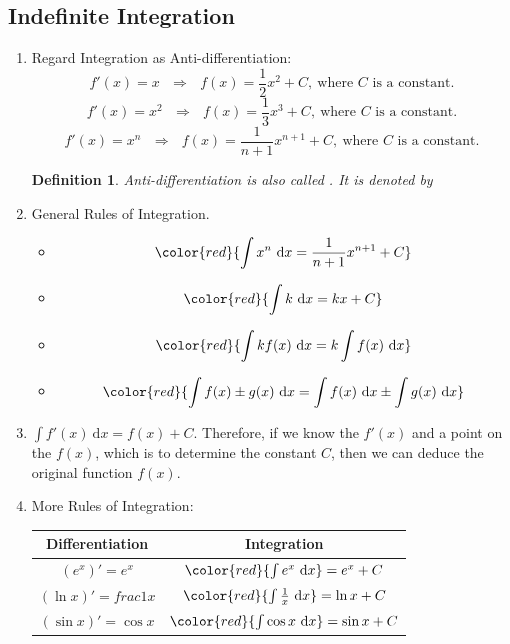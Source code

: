 \documentclass[12pt, a4paper]{article}
\newtheorem{definition}{Definition}[subsection]
\begin{document}
\subsection{Indefinite Integration}
\begin{enumerate}
    \item Regard Integration as Anti-differentiation: 
    $$f'(x)=x\ \ \ \Rightarrow\ \ \ f(x)=\frac{1}{2}x^2+C,\ \text{where }C\text{ is a constant.}$$
    $$f'(x)=x^2\ \ \ \Rightarrow\ \ \ f(x)=\frac{1}{3}x^3+C,\ \text{where }C\text{ is a constant.}$$
    $$f'(x)=x^n\ \ \ \Rightarrow\ \ \ f(x)=\frac{1}{n+1}x^{n+1}+C,\ \text{where }C\text{ is a constant.}$$
    \begin{definition}
        Anti-differentiation is also called \textbf{\color{red}{indefinite integration}}. It is denoted by {}
        \begin{center}{}\end{center}
    \end{definition}
    \item General Rules of Integration. 
    \begin{itemize}
        \item $${\color{red}{\int x^n\ \mathrm{d}x=\frac{1}{n+1}x^{n+1}+C}}$$
        \item $${\color{red}{\int k\ \mathrm{d}x=kx+C}}$$
        \item $${\color{red}{\int kf(x)\ \mathrm{d}x=k\int f(x)\ \mathrm{d}x}}$$
        \item $${\color{red}{\int f(x)\pm g(x)\ \mathrm{d}x=\int f(x)\ \mathrm{d}x\pm\int g(x)\ \mathrm{d}x}}$$
    \end{itemize}
    \item $\int f'(x)\ \mathrm{d}x=f(x)+C.$ Therefore, if we know the $f'(x)$ and a point on the $f(x)$, which is to determine the constant $C$, then we can deduce the original function $f(x)$.
    \item More Rules of Integration:
    \begin{center}\begin{tabular}{c|c}
        Differentiation&Integration\\\hline
        $(e^x)'=e^x$&${\color{red}{\int e^x\ \mathrm{d}x}=e^x+C}$\\
        $(\ln x)'=frac{1}{x}$&${\color{red}{\int \frac{1}{x}\ \mathrm{d}x}=\ln x+C}$\\
        $(\sin x)'=\cos x$&${\color{red}{\int \cos x\ \mathrm{d}x}=\sin x+C}$\\

\end{tabular}
\end{center}
\end{enumerate}
\end{document}
